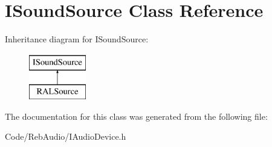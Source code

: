 \hypertarget{class_i_sound_source}{}\section{I\+Sound\+Source Class Reference}
\label{class_i_sound_source}
Inheritance diagram for I\+Sound\+Source\+:\begin{figure}[H]
\begin{center}
\leavevmode
\includegraphics[height=2.000000cm]{class_i_sound_source}
\end{center}
\end{figure}


The documentation for this class was generated from the following file\+:\begin{DoxyCompactItemize}
\item 
Code/\+Reb\+Audio/I\+Audio\+Device.\+h\end{DoxyCompactItemize}
